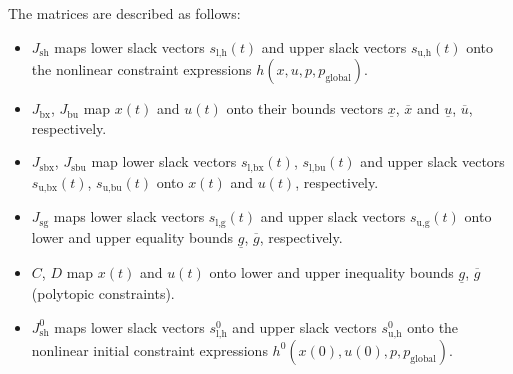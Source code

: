 \documentclass[english]{article}
\newcommand{\ind}[1]{_{\textrm{#1}}}
\newcommand{\initial}{^{\textrm{0}}}
\newcommand{\glob}{_{\textrm{global}}}
\begin{document}
The matrices are described as follows:
\begin{itemize}
    \item $J\ind{sh}$ maps lower slack vectors $s\ind{l,h}(t)$ and upper slack vectors $s\ind{u,h}(t)$ onto the nonlinear constraint expressions $h(x,u,p, p\glob)$.
    \item $J\ind{bx}$, $J\ind{bu}$ map $x(t)$ and $u(t)$ onto their bounds vectors $\underline{x}$, $\overline{x}$ and $\underline{u}$, $\overline{u}$, respectively.
    \item $J\ind{sbx}$, $J\ind{sbu}$ map lower slack vectors $s\ind{l,bx}(t)$, $s\ind{l,bu}(t)$ and upper slack vectors $s\ind{u,bx}(t)$, $s\ind{u,bu}(t)$ onto $x(t)$ and $u(t)$, respectively.
    \item $J\ind{sg}$ maps lower slack vectors $s\ind{l,g}(t)$ and upper slack vectors $s\ind{u,g}(t)$ onto lower and upper equality bounds $\underline{g}$, $\overline{g}$, respectively.
    \item $C$, $D$ map $x(t)$ and $u(t)$ onto lower and upper inequality bounds $\underline{g}$, $\overline{g}$ (polytopic constraints).
    \item $J\ind{sh}\initial$ maps lower slack vectors $s\ind{l,h}\initial$ and upper slack vectors $s\ind{u,h}\initial$ onto the nonlinear initial constraint expressions $h\initial(x(0),u(0),p, p\glob)$.
\end{itemize}
\end{document}
